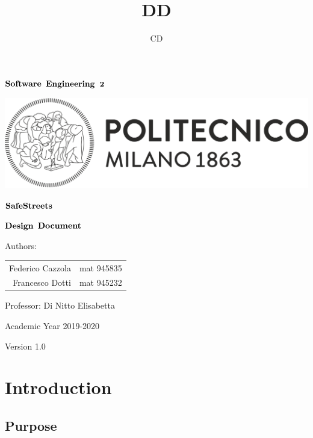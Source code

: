 \documentclass{article}
\author{CD}
\title{DD}
\begin{document}

\thispagestyle{empty} %
\begin{center}

	\vspace{3cm}

	\large $\bf Software$ $\bf Engineering$ $\bf 2$

  \includegraphics[width=\linewidth]{../RASD/images/polimi-logo.png}
  \vspace{2cm}
  

  \Huge $\bf SafeStreets$


	\huge $\bf Design$  $\bf Document$

	\vspace{1cm}

  Authors:
	\vspace{1cm}
	\begin{tabular}{r|l}
		 Federico Cazzola & \large mat 945835\\
		 Francesco Dotti & \large mat 945232\\
	\end{tabular}

	\vspace{1cm}

  Professor: Di Nitto Elisabetta
	
	\vspace{3cm}
  \normalsize Academic Year 2019-2020

	\vspace{2mm}
	\small Version 1.0

\end{center}

\newpage

\tableofcontents

\newpage
  
\section{Introduction}
\subsection{Purpose}
\end{document}
